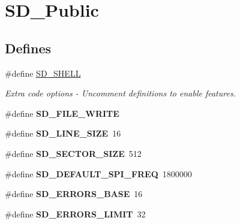 \hypertarget{group__SD__Public}{\section{\-S\-D\-\_\-\-Public}
\label{group__SD__Public}
}
\subsection*{\-Defines}
\begin{DoxyCompactItemize}
\item 
\#define \hyperlink{group__SD__Public_ga453e7feb2ddf9256c6b5ab9399b12abc}{\-S\-D\-\_\-\-S\-H\-E\-L\-L}
\begin{DoxyCompactList}\small\item\em \-Extra code options -\/ \-Uncomment definitions to enable features. \end{DoxyCompactList}\item 
\hypertarget{group__SD__Public_gaf5d27aba1c39917482f4b3d40349e73e}{\#define {\bfseries \-S\-D\-\_\-\-F\-I\-L\-E\-\_\-\-W\-R\-I\-T\-E}}\label{group__SD__Public_gaf5d27aba1c39917482f4b3d40349e73e}

\item 
\hypertarget{group__SD__Public_gaf212493d1701d0e23dd8a98c2e963a7b}{\#define {\bfseries \-S\-D\-\_\-\-L\-I\-N\-E\-\_\-\-S\-I\-Z\-E}~16}\label{group__SD__Public_gaf212493d1701d0e23dd8a98c2e963a7b}

\item 
\hypertarget{group__SD__Public_ga35d62ba285152f13c64ba9e11fe69e7c}{\#define {\bfseries \-S\-D\-\_\-\-S\-E\-C\-T\-O\-R\-\_\-\-S\-I\-Z\-E}~512}\label{group__SD__Public_ga35d62ba285152f13c64ba9e11fe69e7c}

\item 
\hypertarget{group__SD__Public_ga13c71cd2e72c08f268a266c9c6e7c52d}{\#define {\bfseries \-S\-D\-\_\-\-D\-E\-F\-A\-U\-L\-T\-\_\-\-S\-P\-I\-\_\-\-F\-R\-E\-Q}~1800000}\label{group__SD__Public_ga13c71cd2e72c08f268a266c9c6e7c52d}

\item 
\hypertarget{group__SD__Public_ga3cd0c771442b35775f55f3982c2dc873}{\#define {\bfseries \-S\-D\-\_\-\-E\-R\-R\-O\-R\-S\-\_\-\-B\-A\-S\-E}~16}\label{group__SD__Public_ga3cd0c771442b35775f55f3982c2dc873}

\item 
\hypertarget{group__SD__Public_ga62e655fb68f48dbab77aec76faef26ae}{\#define {\bfseries \-S\-D\-\_\-\-E\-R\-R\-O\-R\-S\-\_\-\-L\-I\-M\-I\-T}~32}\label{group__SD__Public_ga62e655fb68f48dbab77aec76faef26ae}


\end{DoxyCompactItemize}

